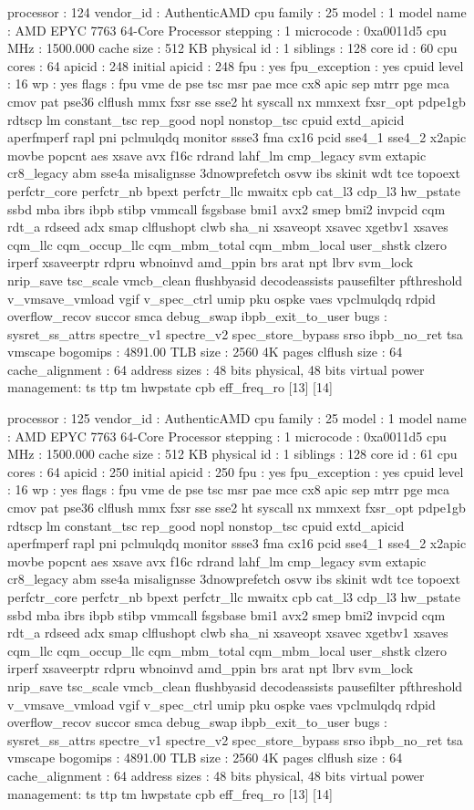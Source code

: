 processor	: 124
vendor_id	: AuthenticAMD
cpu family	: 25
model		: 1
model name	: AMD EPYC 7763 64-Core Processor
stepping	: 1
microcode	: 0xa0011d5
cpu MHz		: 1500.000
cache size	: 512 KB
physical id	: 1
siblings	: 128
core id		: 60
cpu cores	: 64
apicid		: 248
initial apicid	: 248
fpu		: yes
fpu_exception	: yes
cpuid level	: 16
wp		: yes
flags		: fpu vme de pse tsc msr pae mce cx8 apic sep mtrr pge mca cmov pat pse36 clflush mmx fxsr sse sse2 ht syscall nx mmxext fxsr_opt pdpe1gb rdtscp lm constant_tsc rep_good nopl nonstop_tsc cpuid extd_apicid aperfmperf rapl pni pclmulqdq monitor ssse3 fma cx16 pcid sse4_1 sse4_2 x2apic movbe popcnt aes xsave avx f16c rdrand lahf_lm cmp_legacy svm extapic cr8_legacy abm sse4a misalignsse 3dnowprefetch osvw ibs skinit wdt tce topoext perfctr_core perfctr_nb bpext perfctr_llc mwaitx cpb cat_l3 cdp_l3 hw_pstate ssbd mba ibrs ibpb stibp vmmcall fsgsbase bmi1 avx2 smep bmi2 invpcid cqm rdt_a rdseed adx smap clflushopt clwb sha_ni xsaveopt xsavec xgetbv1 xsaves cqm_llc cqm_occup_llc cqm_mbm_total cqm_mbm_local user_shstk clzero irperf xsaveerptr rdpru wbnoinvd amd_ppin brs arat npt lbrv svm_lock nrip_save tsc_scale vmcb_clean flushbyasid decodeassists pausefilter pfthreshold v_vmsave_vmload vgif v_spec_ctrl umip pku ospke vaes vpclmulqdq rdpid overflow_recov succor smca debug_swap ibpb_exit_to_user
bugs		: sysret_ss_attrs spectre_v1 spectre_v2 spec_store_bypass srso ibpb_no_ret tsa vmscape
bogomips	: 4891.00
TLB size	: 2560 4K pages
clflush size	: 64
cache_alignment	: 64
address sizes	: 48 bits physical, 48 bits virtual
power management: ts ttp tm hwpstate cpb eff_freq_ro [13] [14]

processor	: 125
vendor_id	: AuthenticAMD
cpu family	: 25
model		: 1
model name	: AMD EPYC 7763 64-Core Processor
stepping	: 1
microcode	: 0xa0011d5
cpu MHz		: 1500.000
cache size	: 512 KB
physical id	: 1
siblings	: 128
core id		: 61
cpu cores	: 64
apicid		: 250
initial apicid	: 250
fpu		: yes
fpu_exception	: yes
cpuid level	: 16
wp		: yes
flags		: fpu vme de pse tsc msr pae mce cx8 apic sep mtrr pge mca cmov pat pse36 clflush mmx fxsr sse sse2 ht syscall nx mmxext fxsr_opt pdpe1gb rdtscp lm constant_tsc rep_good nopl nonstop_tsc cpuid extd_apicid aperfmperf rapl pni pclmulqdq monitor ssse3 fma cx16 pcid sse4_1 sse4_2 x2apic movbe popcnt aes xsave avx f16c rdrand lahf_lm cmp_legacy svm extapic cr8_legacy abm sse4a misalignsse 3dnowprefetch osvw ibs skinit wdt tce topoext perfctr_core perfctr_nb bpext perfctr_llc mwaitx cpb cat_l3 cdp_l3 hw_pstate ssbd mba ibrs ibpb stibp vmmcall fsgsbase bmi1 avx2 smep bmi2 invpcid cqm rdt_a rdseed adx smap clflushopt clwb sha_ni xsaveopt xsavec xgetbv1 xsaves cqm_llc cqm_occup_llc cqm_mbm_total cqm_mbm_local user_shstk clzero irperf xsaveerptr rdpru wbnoinvd amd_ppin brs arat npt lbrv svm_lock nrip_save tsc_scale vmcb_clean flushbyasid decodeassists pausefilter pfthreshold v_vmsave_vmload vgif v_spec_ctrl umip pku ospke vaes vpclmulqdq rdpid overflow_recov succor smca debug_swap ibpb_exit_to_user
bugs		: sysret_ss_attrs spectre_v1 spectre_v2 spec_store_bypass srso ibpb_no_ret tsa vmscape
bogomips	: 4891.00
TLB size	: 2560 4K pages
clflush size	: 64
cache_alignment	: 64
address sizes	: 48 bits physical, 48 bits virtual
power management: ts ttp tm hwpstate cpb eff_freq_ro [13] [14]

